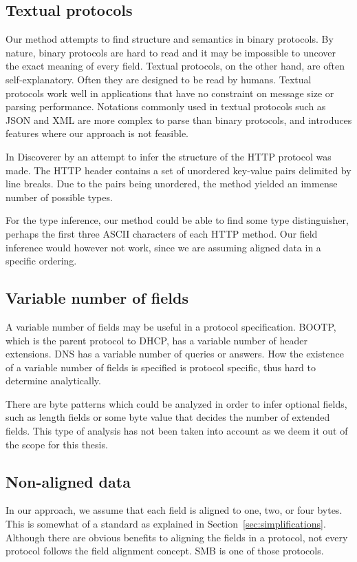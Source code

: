 \documentclass[a4paper]{report}
\begin{document}
\subsection{Textual protocols}
Our method attempts to find structure and semantics in binary protocols.
By nature, binary protocols are hard to read and it may be impossible to
uncover the exact meaning of every field. Textual protocols, on the other
hand, are often self-explanatory. Often they are designed to be read by
humans. Textual protocols work well in applications that have no constraint
on message size or parsing performance. Notations commonly used in textual
protocols such as JSON and XML are more complex to parse than binary protocols,
and introduces features where our approach is not feasible.

In Discoverer by \citeauthor{cui07} an attempt to infer the structure of
the HTTP protocol was made. The HTTP header contains a set of unordered
key-value pairs delimited by line breaks. Due to the pairs being unordered,
the method yielded an immense number of possible types.

For the type inference, our method could be able to find some type
distinguisher, perhaps the first three ASCII characters of each HTTP method.
Our field inference would however not work, since we are assuming aligned
data in a specific ordering.

\subsection{Variable number of fields}
A variable number of fields may be useful in a protocol specification. BOOTP,
which is the parent protocol to DHCP, has a variable number of header 
extensions. DNS has a variable number of queries or answers. How the existence
of a variable number of fields is specified is protocol specific, thus hard to
determine analytically.

There are byte patterns which could be analyzed in order to infer optional
fields, such as length fields or some byte value that decides the number of
extended fields. This type of analysis has not been taken into account as we
deem it out of the scope for this thesis.

\subsection{Non-aligned data}
In our approach, we assume that each field is aligned to one, two, or four
bytes. This is somewhat of a standard as explained in
Section~\ref{sec:simplifications}. Although there are obvious benefits to
aligning the fields in a protocol, not every protocol follows the field
alignment concept. SMB is one of those protocols.
\end{document}
